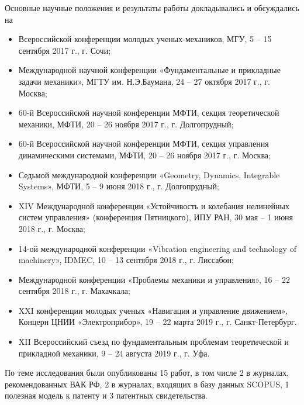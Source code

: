 Основные научные положения и результаты работы докладывались и обсуждались на 
\begin{itemize}
\item Всероссийской конференции молодых ученых-механиков, МГУ, 5 -- 15 сентября 2017 г., г. Сочи;
\item Международной научной конференции «Фундаментальные и прикладные задачи механики», МГТУ им. Н.Э.Баумана, 24 -- 27 октября 2017 г., г. Москва;
\item 60-й Всероссийской научной конференции МФТИ, секция теоретической механики, МФТИ, 20 -- 26 ноября 2017 г., г. Долгопрудный;
\item 60-й Всероссийской научной конференции МФТИ, секция управления динамическими системами, МФТИ, 20 -- 26 ноября 2017 г., г. Москва;
\item Седьмой международной конференции «Geometry, Dynamics, Integrable Systems», МФТИ, 5 -- 9 июня 2018 г., г. Долгопрудный;
\item XIV Международной конференции «Устойчивость и колебания нелинейных систем управления» (конференция Пятницкого), ИПУ РАН, 30 мая -- 1 июня 2018 г., г. Москва;
\item 14-ой международной конференции «Vibration engineering and technology of machinery», IDMEC,  10 -- 13 сентября 2018 г., г. Лиссабон;
\item Международной конференции «Проблемы механики и управления», 16 -- 22 сентября 2018 г., г. Махачкала;
\item XXI конференции молодых ученых «Навигация и управление движением», Концерн ЦНИИ «Электроприбор», 19 -- 22 марта 2019 г., г. Санкт-Петербург.
\item XII Всероссийский съезд по фундаментальным проблемам теоретической и прикладной механики, 9 -- 24 августа 2019 г., г. Уфа.
\end{itemize}
По теме исследования были опубликованы 15 работ, в том числе 2 в журналах, рекомендованных ВАК РФ, 2 в журналах, входящих в базу данных SCOPUS, 1 полезная модель к патенту и 3 патентных свидетельства.

